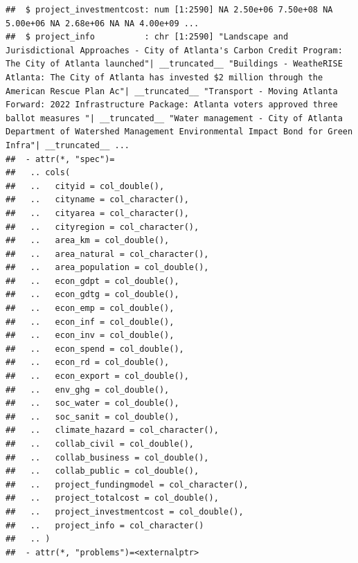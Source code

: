 \documentclass[
]{article}
\begin{document}
\begin{verbatim}
##  $ project_investmentcost: num [1:2590] NA 2.50e+06 7.50e+08 NA 5.00e+06 NA 2.68e+06 NA NA 4.00e+09 ...
##  $ project_info          : chr [1:2590] "Landscape and Jurisdictional Approaches - City of Atlanta's Carbon Credit Program: The City of Atlanta launched"| __truncated__ "Buildings - WeatheRISE Atlanta: The City of Atlanta has invested $2 million through the American Rescue Plan Ac"| __truncated__ "Transport - Moving Atlanta Forward: 2022 Infrastructure Package: Atlanta voters approved three ballot measures "| __truncated__ "Water management - City of Atlanta Department of Watershed Management Environmental Impact Bond for Green Infra"| __truncated__ ...
##  - attr(*, "spec")=
##   .. cols(
##   ..   cityid = col_double(),
##   ..   cityname = col_character(),
##   ..   cityarea = col_character(),
##   ..   cityregion = col_character(),
##   ..   area_km = col_double(),
##   ..   area_natural = col_character(),
##   ..   area_population = col_double(),
##   ..   econ_gdpt = col_double(),
##   ..   econ_gdtg = col_double(),
##   ..   econ_emp = col_double(),
##   ..   econ_inf = col_double(),
##   ..   econ_inv = col_double(),
##   ..   econ_spend = col_double(),
##   ..   econ_rd = col_double(),
##   ..   econ_export = col_double(),
##   ..   env_ghg = col_double(),
##   ..   soc_water = col_double(),
##   ..   soc_sanit = col_double(),
##   ..   climate_hazard = col_character(),
##   ..   collab_civil = col_double(),
##   ..   collab_business = col_double(),
##   ..   collab_public = col_double(),
##   ..   project_fundingmodel = col_character(),
##   ..   project_totalcost = col_double(),
##   ..   project_investmentcost = col_double(),
##   ..   project_info = col_character()
##   .. )
##  - attr(*, "problems")=<externalptr>
\end{verbatim}
\end{document}
